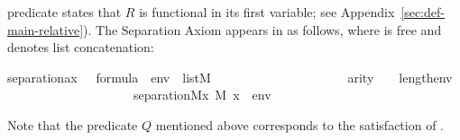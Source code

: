 predicate states that $R$ is functional in its first variable; see Appendix~\ref{sec:def-main-relative}). The Separation Axiom appears in
 as follows, where 
\isa{\isasymphi} is free and \isa{\isacharat} denotes
list concatenation:
\begin{isabelle}
separation{\isacharunderscore}{\kern0pt}ax{\isacharcolon}{\kern0pt}\ {\isachardoublequoteopen}{\isasymphi}\ {\isasymin}\ formula\ {\isasymLongrightarrow}\ env\ {\isasymin}\ list{\isacharparenleft}{\kern0pt}M{\isacharparenright}{\kern0pt}\ {\isasymLongrightarrow}\isanewline
\ \ \ \ \ \ \ \ \ \ \ \ \ \ \ \ \ \ \ \ arity{\isacharparenleft}{\kern0pt}{\isasymphi}{\isacharparenright}{\kern0pt}\ {\isasymle}\ {}\ {\isacharplus}{\kern0pt}\isactrlsub {\isasymomega}\ length{\isacharparenleft}{\kern0pt}env{\isacharparenright}{\kern0pt}\ {\isasymLongrightarrow}\isanewline
\ \ \ \ \ \ \ \ \ \ \ \ \ \ \ \ \ \ \ \ separation{\isacharparenleft}{\kern0pt}{\isacharhash}{\kern0pt}{\isacharhash}{\kern0pt}M{\isacharcomma}{\kern0pt}{\isasymlambda}x{\isachardot}{\kern0pt}\ {\isacharparenleft}{\kern0pt}M{\isacharcomma}{\kern0pt}\ {\isacharbrackleft}{\kern0pt}x{\isacharbrackright}{\kern0pt}\ {\isacharat}{\kern0pt}\ env\ {\isasymTurnstile}\ {\isasymphi}{\isacharparenright}{\kern0pt}{\isacharparenright}{\kern0pt}{\isachardoublequoteclose}
\end{isabelle}
Note that the predicate $Q$ mentioned above corresponds to the
satisfaction of \isa{\isasymphi}.

